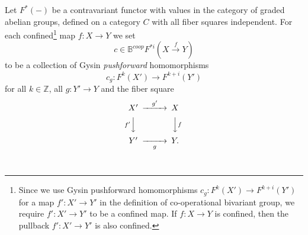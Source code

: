 \documentclass[a4paper]{amsart}
\begin{document}
\begin{thm}
Let $F^*(-)$ be a contravariant functor with values in the category of graded abelian groups, defined on a category $C$ with all fiber squares independent.
For each confined\footnote{Since we use Gysin pushforward homomorphisms $c_g: F^k(X') \to F^{k+i}(Y')$ for a map $f':X' \to Y'$ in the definition of co-operational bivariant group, we require $f':X' \to Y'$ to be a confined map. If $f:X \to Y$ is confined, then the pullback $f':X' \to Y'$ is also confined.} map $f:X \to Y$ we set
$$ c \in \mathbb B^{coop}F^{* i}(X \xrightarrow f Y)$$
to be a collection of Gysin \emph{pushforward} homomorphisms
$$c_g: F^k(X') \to F^{k+i}(Y')$$
for all $k \in \mathbb Z$, all $g:Y' \to Y$  and the fiber square \, \, \, 
$$\CD
X' @> {g'}  >> X\\
@V {f'} VV @VV fV\\
Y' @>> {g} > Y.\\
\endCD
$$ \, \, \, 


\end{thm}
\end{document}
